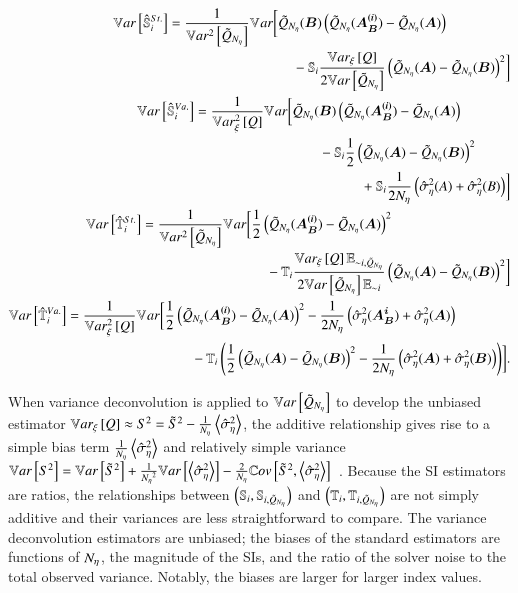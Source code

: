 \begin{align} \label{eq:var-s-stan}
\begin{split}
    \mathbb{V}ar\left[\hat{\mathbb{S}}_{i}^{St.}\right] &= \frac{1}{\mathbb{V}ar^2\left[\tilde{Q}_{{N_\eta}}\right]} \mathbb{V}_{}ar \biggl[\tilde{Q}_{{N_\eta}}(\bm{B}) \left( \tilde{Q}_{{N_\eta}}(\bm{A_B^{(i)}}) - \tilde{Q}_{{N_\eta}}(\bm{A}) \right) \\
    &\qquad \qquad \qquad \qquad \quad  - \mathbb{S}_{i} \frac{\mathbb{V}ar_{\xi}\left[Q\right]}{2\mathbb{V}ar\left[\tilde{Q}_{{N_\eta}}\right]} \left( \tilde{Q}_{{N_\eta}}(\bm{A}) - \tilde{Q}_{{N_\eta}}(\bm{B}) \right)^2 \biggr]
\end{split} \\ \label{eq:var-s-vd}
\begin{split}
    \mathbb{V}ar\left[\hat{\mathbb{S}}_{i}^{Va.}\right] &= \frac{1}{\mathbb{V}ar^2_{\xi}\left[Q\right]} \mathbb{V}_{} ar \biggl[\tilde{Q}_{{N_\eta}}(\bm{B}) \left( \tilde{Q}_{{N_\eta}}(\bm{A_B^{(i)}}) - \tilde{Q}_{{N_\eta}}(\bm{A}) \right) \\
    &\qquad \qquad \qquad \qquad \quad - \mathbb{S}_{i} \frac{1}{2} \left( \tilde{Q}_{{N_\eta}}(\bm{A}) - \tilde{Q}_{{N_\eta}}(\bm{B}) \right)^2 \\
    &\qquad \qquad \qquad \qquad \qquad \qquad + \mathbb{S}_{i} \frac{1}{2{N_\eta}} \left( \hat{\sigma}^2_\eta(A) + \hat{\sigma}^2_\eta(B) \right) \biggr]
\end{split} \\ \label{eq:var-t-stan}
\begin{split}
    \mathbb{V}ar\left[\hat{\mathbb{T}}_{i}^{St.}\right] &= \frac{1}{\mathbb{V}ar^2\left[\tilde{Q}_{{N_\eta}}\right]} \mathbb{V}_{} ar \biggl[\frac{1}{2} \left( \tilde{Q}_{{N_\eta}}(\bm{A_B^{(i)}}) - \tilde{Q}_{{N_\eta}}(\bm{A}) \right)^2 \\
    &\qquad \qquad \qquad \qquad \quad - \mathbb{T}_{i} \frac{\mathbb{V}ar_{\xi}\left[Q\right] \mathbb{E}_{{\sim i}, \tilde{Q}_{{N_\eta}}}}{2\mathbb{V}ar\left[\tilde{Q}_{{N_\eta}}\right] \mathbb{E}_{{\sim i}}} \left( \tilde{Q}_{{N_\eta}}(\bm{A}) - \tilde{Q}_{{N_\eta}}(\bm{B}) \right)^2 \biggr] 
\end{split} \\ \label{eq:var-t-vd}
\begin{split}
    \mathbb{V}ar\left[\hat{\mathbb{T}}_{i}^{Va.}\right] &= \frac{1}{\mathbb{V}ar^2_{\xi}\left[Q\right]} \mathbb{V}_{} ar \biggl[\frac{1}{2} \left( \tilde{Q}_{{N_\eta}}(\bm{A_B^{(i)}}) - \tilde{Q}_{{N_\eta}}(\bm{A}) \right)^2 - \frac{1}{2{N_\eta}} \left( \hat{\sigma}^2_\eta(\bm{A_B^i}) + \hat{\sigma}^2_\eta(\bm{A}) \right) \\
    &\qquad \qquad \qquad \qquad \quad - \mathbb{T}_{i} \left( \frac{1}{2} \left( \tilde{Q}_{{N_\eta}}(\bm{A}) - \tilde{Q}_{{N_\eta}}(\bm{B}) \right)^2 - \frac{1}{2{N_\eta}} \left( \hat{\sigma}^2_\eta(\bm{A}) + \hat{\sigma}^2_\eta(\bm{B}) \right) \right) \biggr].
\end{split}
\end{align}

When variance deconvolution is applied to $\mathbb{V}ar\left[\tilde{Q}_{{N_\eta}}\right]$ to develop the unbiased estimator $\mathbb{V}ar_{\xi}\left[Q\right] \approx S^2 = \tilde{S}^2 - \frac{1}{{N_\eta}}\left< \hat{\sigma}^2_\eta \right>$, the additive relationship gives rise to a simple bias term $\frac{1}{{N_\eta}}\left< \hat{\sigma}^2_\eta \right>$ and relatively simple variance $\mathbb{V}ar\left[S^2\right] = \mathbb{V}ar\left[\tilde{S}^2\right] + \frac{1}{{N_\eta}^2} \mathbb{V}ar\left[\left< \hat{\sigma}^2_\eta \right>\right] - \frac{2}{{N_\eta}} \mathbb{C}ov\left[\tilde{S}^2,\left< \hat{\sigma}^2_\eta \right>\right]$~\cite{clements-etal-2024}.
Because the SI estimators are ratios, the relationships between $\left(\mathbb{S}_{i},\mathbb{S}_{i, \tilde{Q}_{{N_\eta}}}\right)$ and $\left(\mathbb{T}_{i},\mathbb{T}_{i, \tilde{Q}_{{N_\eta}}}\right)$ are not simply additive and their variances are less straightforward to compare.
The variance deconvolution estimators are unbiased; the biases of the standard estimators are functions of ${N_\eta}$, the magnitude of the SIs, and the ratio of the solver noise to the total observed variance.
Notably, the biases are larger for larger index values.

